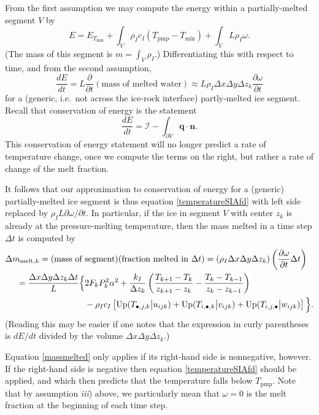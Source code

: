\documentclass[12pt,final]{amsart}%
\theoremstyle{plain}
\theoremstyle{definition}
\theoremstyle{remark}
\newcommand{\DDt}[1]{\ensuremath{\frac{d #1}{d t}}}
\newcommand{\ddt}[1]{\ensuremath{\frac{\partial #1}{\partial t}}}
\newcommand{\nhat}{\mathbf{n}}
\newcommand{\Up}{\ensuremath{\operatorname{Up}}}
\newcommand{\Tpmp}{T_{\text{pmp}}}
\newcommand{\bq}{{\mathbf{q}}}
\begin{document}
From the first assumption we may compute the energy within a partially-melted segment $V$ by
    $$E = E_{T_{\min}} + \int_V \rho_I c_I (\Tpmp-T_{\min}) + \int_V L \rho_I \omega.$$
(The mass of this segment is $m=\int_V \rho_I$.)  Differentiating this with respect to time, and from the second assumption,
\begin{equation*}
\DDt{E} = L \ddt{}\left(\text{mass of melted water}\right) \approx L \rho_I \Delta x\Delta y \Delta z_k \ddt{\omega}
\end{equation*}
for a (generic, i.e.~not across the ice-rock interface) partly-melted ice segment.  Recall that conservation of energy is the statement
    $$\DDt{E} = \mathcal{I} - \int_{\partial V} \bq \cdot \nhat.$$
This conservation of energy statement will no longer predict a rate of temperature change, once we compute the terms on the right, but rather a rate of change of the melt fraction.

It follows that our approximation to conservation of energy for a (generic) partially-melted ice segment is thus equation \eqref{temperatureSIAfd} with left side replaced by $\rho_I L \partial\omega/\partial t$.  In particular, if the ice in segment $V$ with center $z_k$ is already at the pressure-melting temperature, then the mass melted in a time step $\Delta t$ is computed by
\begin{align}
\Delta m_{\text{melt},k} = (\text{mass of }&\text{segment})(\text{fraction melted in }\Delta t) = (\rho_I \Delta x\Delta y \Delta z_k)\left(\ddt{\omega}\Delta t\right) \label{massmelted} \\
    = \frac{\Delta x\Delta y \Delta z_k\Delta t}{L} \Big\{&2 F_k P_k^2 \alpha^2 + \frac{k_I}{\Delta z_k} \left(\frac{T_{k+1}-T_k}{z_{k+1}-z_k} - \frac{T_k-T_{k-1}}{z_k-z_{k-1}}\right) \notag\\
    &- \rho_I c_I \left[\Up(T_{\bullet,j,k} \big|u_{ijk}) + \Up(T_{i,\bullet,k} \big|v_{ijk}) + \Up(T_{i,j,\bullet} \big|w_{ijk})\right]\Big\}. \notag
\end{align}
(Reading this may be easier if one notes that the expression in curly parentheses is $dE/dt$ divided by the volume $\Delta x\Delta y \Delta z_k$.)

Equation \eqref{massmelted} only applies if its right-hand side is nonnegative, however.  If the right-hand side is negative then equation \eqref{temperatureSIAfd} should be applied, and which then predicts that the temperature falls below $\Tpmp$.  Note that by assumption \emph{iii}) above, we particularly mean that $\omega=0$ is the melt fraction at the beginning of each time step.
\end{document}
